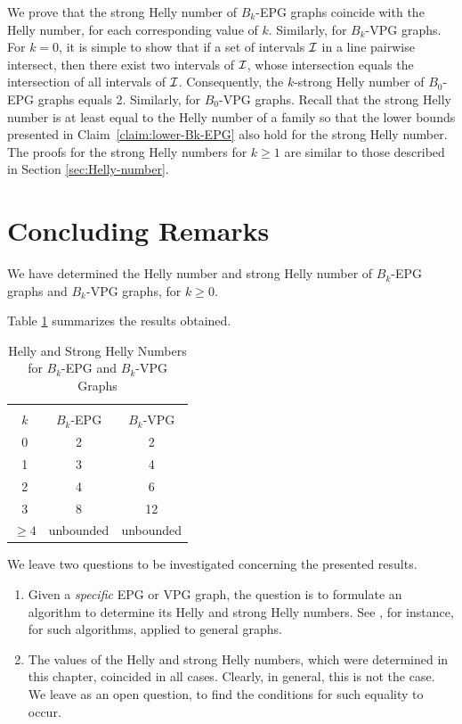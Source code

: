 We prove that the strong Helly number of $B_k$-EPG graphs coincide with the Helly number, for each corresponding value of $k$. Similarly, for $B_k$-VPG graphs. For $k=0$, it is simple to show that if a set of intervals $\cal I$ in a line pairwise intersect, then there exist two intervals of $\cal I$, whose intersection equals the intersection of all intervals of $\cal I$. Consequently, the $k$-strong Helly number of $B_0$-EPG graphs equals 2. 
Similarly, for $B_0$-VPG graphs. 
Recall that the strong Helly number is at least equal to the Helly number of a family so that the lower bounds presented in Claim~\ref{claim:lower-Bk-EPG} also hold for the strong Helly number. The proofs for the strong Helly numbers for $k \geq 1$ are similar to those described in Section \ref{sec:Helly-number}.  



\section{Concluding Remarks}\label{sec:concludingRemarks}
We have determined the Helly number and strong Helly number of $B_k$-EPG graphs and $B_k$-VPG graphs, for $k \geq 0$. 

Table \ref{tab:Helly-Strong-Helly} summarizes the results obtained.
 
\Large 

\begin{table}[htb]
    \centering
    \caption{Helly and Strong Helly Numbers for $B_k$-EPG and $B_k$-VPG Graphs}
    \label{tab:Helly-Strong-Helly}
    \begin{tabular}{c|c|c}
     \multicolumn{3}{c}{}\\
    \cline{1-3} $k$  & $B_k$-EPG & $B_k$-VPG \\
    \cline{1-3} 0 & 2 & 2 \\
    \cline{1-3} 1 & 3 & 4 \\
    \cline{1-3} 2 & 4 & 6 \\
    \cline{1-3} 3 & 8 & 12 \\
    \cline{1-3} $\geq 4$ & unbounded & unbounded \\
    \cline{1-3} 
    \end{tabular}
\end{table}

\normalsize

We leave two questions to be investigated concerning the presented results.

\begin{enumerate}
\item Given a {\it specific}  EPG or VPG graph, the question is to formulate an algorithm to determine its Helly and strong Helly numbers. See \cite{dourado2008improved}, for instance, for such algorithms, applied to general graphs. 

\item The values of the Helly and strong Helly numbers, which were determined in this chapter, coincided in all cases. Clearly, in general, this is not the case. We leave as an open question, to find the conditions for such equality to occur. \end{enumerate}


